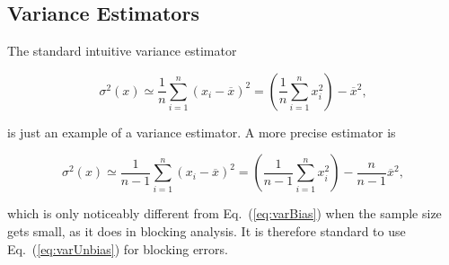 \subsection{Variance Estimators}

The standard intuitive variance estimator

\begin{equation}
\label{eq:varBias}
 \sigma^2(x) \simeq \frac{1}{n}\sum_{i=1}^n (x_i - \overline{x})^2 = \left(\frac{1}{n}\sum_{i=1}^n x_i^2\right) - \overline{x}^2,
\end{equation}

is just an example of a variance estimator. A more precise estimator is 

\begin{equation}
\label{eq:varUnbias}
 \sigma^2(x) \simeq \frac{1}{n-1}\sum_{i=1}^n (x_i - \overline{x})^2 = \left(\frac{1}{n-1}\sum_{i=1}^n x_i^2\right) - \frac{n}{n-1}\overline{x}^2,
\end{equation}

which is only noticeably different from Eq.~(\ref{eq:varBias}) when the sample size gets small, as it does in blocking analysis. It is therefore standard to use Eq.~(\ref{eq:varUnbias}) for blocking errors.


